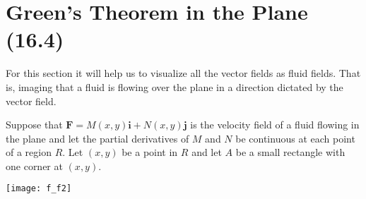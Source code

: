 \documentclass[12pt, letter]{article}
\theoremstyle{plain}
\numberwithin{theorem}{section}
\theoremstyle{definition}
\begin{document}
\section{Green's Theorem in the Plane (16.4)}

For this section it will help us to visualize all the vector fields as fluid fields. That is, imaging that a fluid is flowing over the plane in a direction dictated by the vector field.

\bigskip

Suppose that $\bm{F}=M(x,y)\bm{i}+N(x,y)\bm{j}$ is the velocity field of a fluid flowing in the plane and let the partial derivatives of $M$ and $N$ be continuous at each point of a region $R$. Let $(x,y)$ be a point in $R$ and let $A$ be a small rectangle with one corner at $(x,y)$.

\bigskip

\begin{center}
\texttt{[image: f\_f2]}
\end{center}

\bigskip
\end{document}
